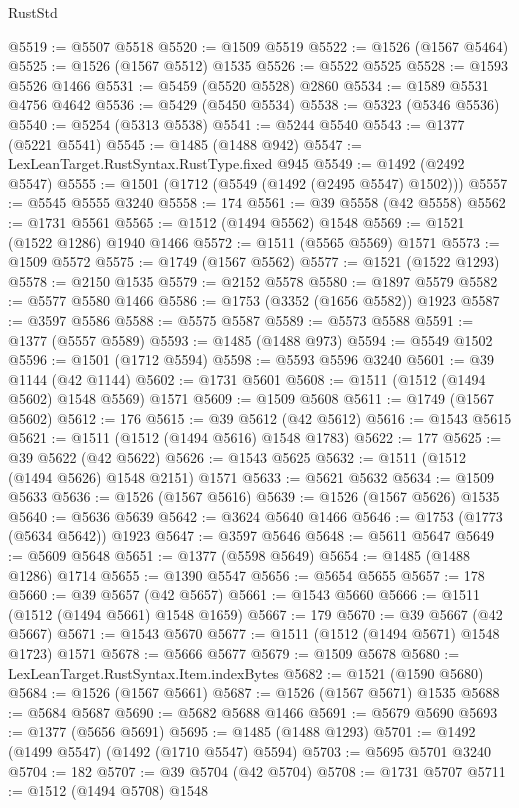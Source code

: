 \begin{lexlean}{RustStd}
\begin{coremodule}
{{@5519 := @5507 @5518
@5520 := @1509 @5519
@5522 := @1526 (@1567 @5464)
@5525 := @1526 (@1567 @5512) @1535
@5526 := @5522 @5525
@5528 := @1593 @5526 @1466
@5531 := @5459 (@5520 @5528) @2860
@5534 := @1589 @5531 @4756 @4642
@5536 := @5429 (@5450 @5534)
@5538 := @5323 (@5346 @5536)
@5540 := @5254 (@5313 @5538)
@5541 := @5244 @5540
@5543 := @1377 (@5221 @5541)
@5545 := @1485 (@1488 @942)
@5547 := LexLeanTarget.RustSyntax.RustType.fixed @945
@5549 := @1492 (@2492 @5547)
@5555 := @1501 (@1712 (@5549 (@1492 (@2495 @5547) @1502)))
@5557 := @5545 @5555 @3240
@5558 := 174
@5561 := @39 @5558 (@42 @5558)
@5562 := @1731 @5561
@5565 := @1512 (@1494 @5562) @1548
@5569 := @1521 (@1522 @1286) @1940 @1466
@5572 := @1511 (@5565 @5569) @1571
@5573 := @1509 @5572
@5575 := @1749 (@1567 @5562)
@5577 := @1521 (@1522 @1293)
@5578 := @2150 @1535
@5579 := @2152 @5578
@5580 := @1897 @5579
@5582 := @5577 @5580 @1466
@5586 := @1753 (@3352 (@1656 @5582)) @1923
@5587 := @3597 @5586
@5588 := @5575 @5587
@5589 := @5573 @5588
@5591 := @1377 (@5557 @5589)
@5593 := @1485 (@1488 @973)
@5594 := @5549 @1502
@5596 := @1501 (@1712 @5594)
@5598 := @5593 @5596 @3240
@5601 := @39 @1144 (@42 @1144)
@5602 := @1731 @5601
@5608 := @1511 (@1512 (@1494 @5602) @1548 @5569) @1571
@5609 := @1509 @5608
@5611 := @1749 (@1567 @5602)
@5612 := 176
@5615 := @39 @5612 (@42 @5612)
@5616 := @1543 @5615
@5621 := @1511 (@1512 (@1494 @5616) @1548 @1783)
@5622 := 177
@5625 := @39 @5622 (@42 @5622)
@5626 := @1543 @5625
@5632 := @1511 (@1512 (@1494 @5626) @1548 @2151) @1571
@5633 := @5621 @5632
@5634 := @1509 @5633
@5636 := @1526 (@1567 @5616)
@5639 := @1526 (@1567 @5626) @1535
@5640 := @5636 @5639
@5642 := @3624 @5640 @1466
@5646 := @1753 (@1773 (@5634 @5642)) @1923
@5647 := @3597 @5646
@5648 := @5611 @5647
@5649 := @5609 @5648
@5651 := @1377 (@5598 @5649)
@5654 := @1485 (@1488 @1286) @1714
@5655 := @1390 @5547
@5656 := @5654 @5655
@5657 := 178
@5660 := @39 @5657 (@42 @5657)
@5661 := @1543 @5660
@5666 := @1511 (@1512 (@1494 @5661) @1548 @1659)
@5667 := 179
@5670 := @39 @5667 (@42 @5667)
@5671 := @1543 @5670
@5677 := @1511 (@1512 (@1494 @5671) @1548 @1723) @1571
@5678 := @5666 @5677
@5679 := @1509 @5678
@5680 := LexLeanTarget.RustSyntax.Item.indexBytes
@5682 := @1521 (@1590 @5680)
@5684 := @1526 (@1567 @5661)
@5687 := @1526 (@1567 @5671) @1535
@5688 := @5684 @5687
@5690 := @5682 @5688 @1466
@5691 := @5679 @5690
@5693 := @1377 (@5656 @5691)
@5695 := @1485 (@1488 @1293)
@5701 := @1492 (@1499 @5547) (@1492 (@1710 @5547) @5594)
@5703 := @5695 @5701 @3240
@5704 := 182
@5707 := @39 @5704 (@42 @5704)
@5708 := @1731 @5707
@5711 := @1512 (@1494 @5708) @1548
}}
\end{coremodule}
\end{lexlean}
